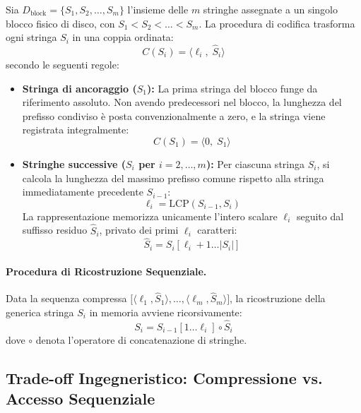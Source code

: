 Sia $D_{\text{block}} = \{S_1, S_2, \dots, S_m\}$ l'insieme delle $m$ stringhe assegnate a un singolo blocco fisico di disco, con $S_1 < S_2 < \dots < S_m$. La procedura di codifica trasforma ogni stringa $S_i$ in una coppia ordinata:
\begin{equation}
  C(S_i) = \langle \ell_i, \; \hat{S}_i \rangle
\end{equation}
secondo le seguenti regole:
\begin{itemize}
  \item \textbf{Stringa di ancoraggio ($S_1$):} La prima stringa del blocco funge da riferimento assoluto. Non avendo predecessori nel blocco, la lunghezza del prefisso condiviso \`e posta convenzionalmente a zero, e la stringa viene registrata integralmente:
  \begin{equation}
    C(S_1) = \langle 0, \; S_1 \rangle
  \end{equation}
  \item \textbf{Stringhe successive ($S_i$ per $i = 2, \dots, m$):} Per ciascuna stringa $S_i$, si calcola la lunghezza del massimo prefisso comune rispetto alla stringa immediatamente precedente $S_{i-1}$:
  \begin{equation}
    \ell_i = \text{LCP}(S_{i-1}, S_i)
  \end{equation}
  La rappresentazione memorizza unicamente l'intero scalare $\ell_i$ seguito dal suffisso residuo $\hat{S}_i$, privato dei primi $\ell_i$ caratteri:
  \begin{equation}
    \hat{S}_i = S_i[\ell_i + 1 \dots |S_i|]
  \end{equation}
\end{itemize}

\paragraph{Procedura di Ricostruzione Sequenziale.}
Data la sequenza compressa $\big[ \langle \ell_1, \hat{S}_1 \rangle, \dots, \langle \ell_m, \hat{S}_m \rangle \big]$, la ricostruzione della generica stringa $S_i$ in memoria avviene ricorsivamente:
\begin{equation}
  S_i = S_{i-1}[1 \dots \ell_i] \circ \hat{S}_i
\end{equation}
dove $\circ$ denota l'operatore di concatenazione di stringhe.

\FloatBarrier
\subsection{Trade-off Ingegneristico: Compressione vs. Accesso Sequenziale}
\label{subsec:trade-off-front-coding}

